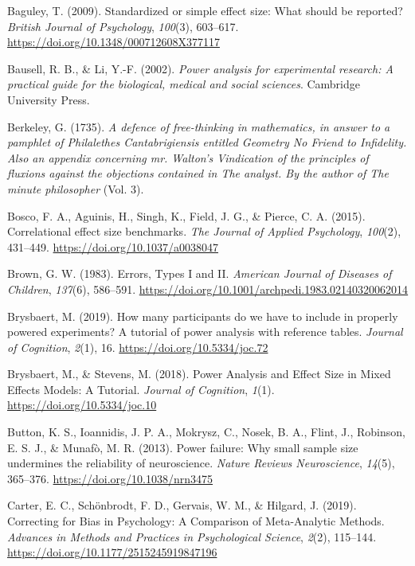 \documentclass[
  english,
  ,jou, a4paper,floatsintext]{apa6}
\newlength{\cslhangindent}
\newenvironment{cslreferences}%
  {\setlength{\parindent}{0pt}%
  \everypar{\setlength{\hangindent}{\cslhangindent}}\ignorespaces}%
  {\par}
\begin{document}
\begin{cslreferences}
\leavevmode\hypertarget{ref-baguley_standardized_2009}{}%
Baguley, T. (2009). Standardized or simple effect size: What should be reported? \emph{British Journal of Psychology}, \emph{100}(3), 603--617. \url{https://doi.org/10.1348/000712608X377117}

\leavevmode\hypertarget{ref-bausell_power_2002}{}%
Bausell, R. B., \& Li, Y.-F. (2002). \emph{Power analysis for experimental research: A practical guide for the biological, medical and social sciences}. Cambridge University Press.

\leavevmode\hypertarget{ref-berkeley_defence_1735}{}%
Berkeley, G. (1735). \emph{A defence of free-thinking in mathematics, in answer to a pamphlet of Philalethes Cantabrigiensis entitled Geometry No Friend to Infidelity. Also an appendix concerning mr. Walton's Vindication of the principles of fluxions against the objections contained in The analyst. By the author of The minute philosopher} (Vol. 3).

\leavevmode\hypertarget{ref-bosco_correlational_2015}{}%
Bosco, F. A., Aguinis, H., Singh, K., Field, J. G., \& Pierce, C. A. (2015). Correlational effect size benchmarks. \emph{The Journal of Applied Psychology}, \emph{100}(2), 431--449. \url{https://doi.org/10.1037/a0038047}

\leavevmode\hypertarget{ref-brown_errors_1983}{}%
Brown, G. W. (1983). Errors, Types I and II. \emph{American Journal of Diseases of Children}, \emph{137}(6), 586--591. \url{https://doi.org/10.1001/archpedi.1983.02140320062014}

\leavevmode\hypertarget{ref-brysbaert_how_2019-1}{}%
Brysbaert, M. (2019). How many participants do we have to include in properly powered experiments? A tutorial of power analysis with reference tables. \emph{Journal of Cognition}, \emph{2}(1), 16. \url{https://doi.org/10.5334/joc.72}

\leavevmode\hypertarget{ref-brysbaert_power_2018}{}%
Brysbaert, M., \& Stevens, M. (2018). Power Analysis and Effect Size in Mixed Effects Models: A Tutorial. \emph{Journal of Cognition}, \emph{1}(1). \url{https://doi.org/10.5334/joc.10}

\leavevmode\hypertarget{ref-button_power_2013}{}%
Button, K. S., Ioannidis, J. P. A., Mokrysz, C., Nosek, B. A., Flint, J., Robinson, E. S. J., \& Munafò, M. R. (2013). Power failure: Why small sample size undermines the reliability of neuroscience. \emph{Nature Reviews Neuroscience}, \emph{14}(5), 365--376. \url{https://doi.org/10.1038/nrn3475}

\leavevmode\hypertarget{ref-carter_correcting_2019}{}%
Carter, E. C., Schönbrodt, F. D., Gervais, W. M., \& Hilgard, J. (2019). Correcting for Bias in Psychology: A Comparison of Meta-Analytic Methods. \emph{Advances in Methods and Practices in Psychological Science}, \emph{2}(2), 115--144. \url{https://doi.org/10.1177/2515245919847196}


\end{cslreferences}
\end{document}
